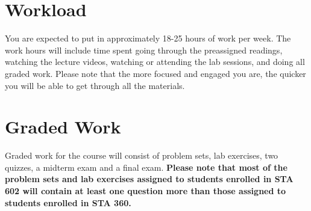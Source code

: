 \documentclass[11pt, a4paper]{article}
\begin{document}
\section{Workload}
You are expected to put in approximately 18-25 hours of work per week. %
The work hours will include time spent going through the preassigned readings, watching the lecture videos, watching or attending the lab sessions, and doing all graded work. Please note that the more focused and engaged you are, the quicker you will be able to get through all the materials.

\section{Graded Work} 
Graded work for the course will consist of problem sets, lab exercises, two quizzes, a midterm exam and a final exam. \textbf{Please note that most of the problem sets and lab exercises assigned to students enrolled in STA 602 will contain at least one question more than those assigned to students enrolled in STA 360. }
\end{document}
